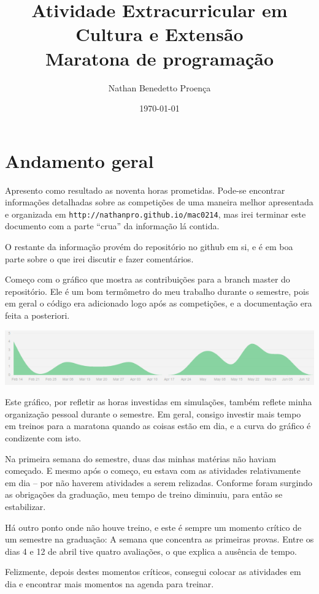 \documentclass{article}
\title{Atividade Extracurricular em Cultura e Extensão\\
       Maratona de programação}
\author{Nathan Benedetto Proença}
\date{\today}
\begin{document}
\maketitle
\section{Andamento geral}

Apresento como resultado as noventa horas prometidas. Pode-se
encontrar informações detalhadas sobre as competições de uma
maneira melhor apresentada e organizada em \texttt{http://nathanpro.github.io/mac0214},
mas irei terminar este documento com a parte ``crua'' da informação
lá contida.

O restante da informação provém do repositório no github em si,
e é em boa parte sobre o que irei discutir e fazer comentários.

Começo com o gráfico que mostra as contribuições para a branch
master do repositório. Ele é um bom termômetro do meu trabalho
durante o semestre, pois em geral o código era adicionado logo
após as competições, e a documentação era feita a posteriori.

\begin{center}
    \includegraphics[scale=.55]{andamento}
\end{center}

Este gráfico, por refletir as horas investidas em simulações,
também reflete minha organização pessoal durante o semestre.
Em geral, consigo investir mais tempo em treinos para a maratona
quando as coisas estão em dia, e a curva do gráfico é condizente
com isto.

Na primeira semana do semestre, duas das minhas matérias não
haviam começado. E mesmo após o começo, eu estava com as atividades
relativamente em dia -- por não haverem atividades a serem relizadas.
Conforme foram surgindo as obrigações da graduação, meu tempo de
treino diminuiu, para então se estabilizar.

Há outro ponto onde não houve treino, e este é sempre um momento
crítico de um semestre na graduação: A semana que concentra as
primeiras provas. Entre os dias 4 e 12 de abril tive quatro
avaliações, o que explica a ausência de tempo.

Felizmente, depois destes momentos críticos, consegui colocar
as atividades em dia e encontrar mais momentos na agenda para
treinar.
\end{document}
